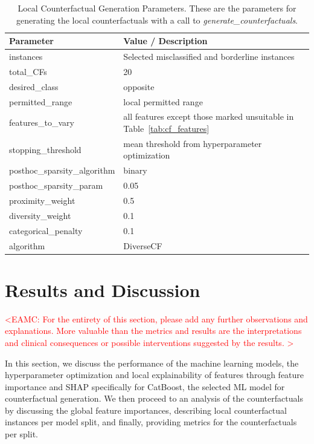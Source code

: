 \documentclass[fleqn,10pt]{wlscirep}
\begin{document}
\begin{table}[h!]
\centering
\small
\begin{tabular}{ll}
\hline
\textbf{Parameter} & \textbf{Value / Description} \\
\hline
instances & Selected misclassified and borderline instances \\
total\_CFs & 20 \\
desired\_class & opposite \\
permitted\_range & local permitted range \\
features\_to\_vary & all features except those marked unsuitable in Table~\ref{tab:cf_features} \\
stopping\_threshold & mean threshold from hyperparameter optimization \\
posthoc\_sparsity\_algorithm & binary \\
posthoc\_sparsity\_param & 0.05 \\
proximity\_weight & 0.5 \\
diversity\_weight & 0.1 \\
categorical\_penalty & 0.1 \\
algorithm & DiverseCF \\
\hline
\end{tabular}
\caption{Local Counterfactual Generation Parameters. These are the parameters for generating the local counterfactuals with a call to \textit{generate\_counterfactuals}.}
\label{tab:local_cf}
\end{table}


\section*{Results and Discussion}
 \textcolor{red}{<EAMC: For the entirety of this section, please add any further observations and explanations. More valuable than the metrics and results are the interpretations and clinical consequences or possible interventions suggested by the results.
 >}  
 
In this section, we discuss the performance of the machine learning models, the hyperparameter optimization and local explainability of features through feature importance and SHAP specifically for CatBoost, the selected ML model for counterfactual generation. We then proceed to an analysis of the counterfactuals by discussing the  global feature importances, describing local counterfactual instances per model split, and finally, providing metrics for the counterfactuals per split.
\end{document}

